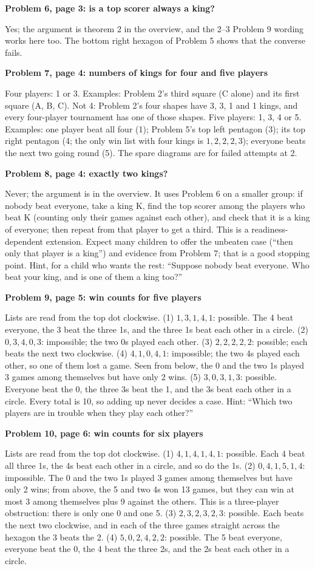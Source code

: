 \documentclass[11pt]{article}
\newcommand{\sub}[1]{\par\needspace{3\baselineskip}\textbf{#1}\par}
\begin{document}
\sub{Problem 6, page 3: is a top scorer always a king?}
Yes; the argument is theorem 2 in the overview, and the 2--3 Problem 9 wording works here too. The bottom right hexagon of Problem 5 shows that the converse fails.

\sub{Problem 7, page 4: numbers of kings for four and five players}
Four players: 1 or 3. Examples: Problem 2's third square (C alone) and its first square (A, B, C). Not 4: Problem 2's four shapes have 3, 3, 1 and 1 kings, and every four-player tournament has one of those shapes. Five players: 1, 3, 4 or 5. Examples: one player beat all four (1); Problem 5's top left pentagon (3); its top right pentagon (4; the only win list with four kings is $1,2,2,2,3$); everyone beats the next two going round (5). The spare diagrams are for failed attempts at 2.

\sub{Problem 8, page 4: exactly two kings?}
Never; the argument is in the overview. It uses Problem 6 on a smaller group: if nobody beat everyone, take a king K, find the top scorer among the players who beat K (counting only their games against each other), and check that it is a king of everyone; then repeat from that player to get a third. This is a readiness-dependent extension. Expect many children to offer the unbeaten case (``then only that player is a king'') and evidence from Problem 7; that is a good stopping point. Hint, for a child who wants the rest: ``Suppose nobody beat everyone. Who beat your king, and is one of them a king too?''

\sub{Problem 9, page 5: win counts for five players}
Lists are read from the top dot clockwise. (1) $1,3,1,4,1$: possible. The 4 beat everyone, the 3 beat the three 1s, and the three 1s beat each other in a circle. (2) $0,3,4,0,3$: impossible; the two 0s played each other. (3) $2,2,2,2,2$: possible; each beats the next two clockwise. (4) $4,1,0,4,1$: impossible; the two 4s played each other, so one of them lost a game. Seen from below, the 0 and the two 1s played 3 games among themselves but have only 2 wins. (5) $3,0,3,1,3$: possible. Everyone beat the 0, the three 3s beat the 1, and the 3s beat each other in a circle. Every total is 10, so adding up never decides a case. Hint: ``Which two players are in trouble when they play each other?''

\sub{Problem 10, page 6: win counts for six players}
Lists are read from the top dot clockwise. (1) $4,1,4,1,4,1$: possible. Each 4 beat all three 1s, the 4s beat each other in a circle, and so do the 1s. (2) $0,4,1,5,1,4$: impossible. The 0 and the two 1s played 3 games among themselves but have only 2 wins; from above, the 5 and two 4s won 13 games, but they can win at most 3 among themselves plus 9 against the others. This is a three-player obstruction: there is only one 0 and one 5. (3) $2,3,2,3,2,3$: possible. Each beats the next two clockwise, and in each of the three games straight across the hexagon the 3 beats the 2. (4) $5,0,2,4,2,2$: possible. The 5 beat everyone, everyone beat the 0, the 4 beat the three 2s, and the 2s beat each other in a circle.
\end{document}
